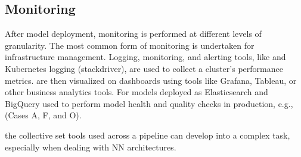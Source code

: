 \subsection{Monitoring}
After model deployment, monitoring is performed at different levels of granularity. The most common form of monitoring is undertaken for infrastructure management. Logging, monitoring, and alerting \DIFdelbegin {}\DIFdelend tools, like \DIFdelbegin {}\DIFdelend \DIFaddbegin {}\DIFaddend and Kubernetes logging (stackdriver), are used to collect a cluster's performance metrics. \DIFdelbegin {}\DIFdelend \DIFaddbegin {}\DIFaddend are then visualized on dashboards using tools like Grafana, Tableau, or other business analytics tools. For models deployed as \DIFdelbegin {}\DIFdelend \DIFaddbegin {}\DIFaddend Elasticsearch and BigQuery \DIFdelbegin {}\DIFdelend \DIFaddbegin {}\DIFaddend used to perform model health and quality checks in production, e.g., \DIFdelbegin {}\DIFdelend \DIFaddbegin {}\DIFaddend (Cases A, F, and O).
\DIFdelbegin {}\DIFdelend \DIFaddbegin 

\DIFaddend the collective set tools used across a pipeline can develop into a complex task, especially when dealing with NN architectures.



